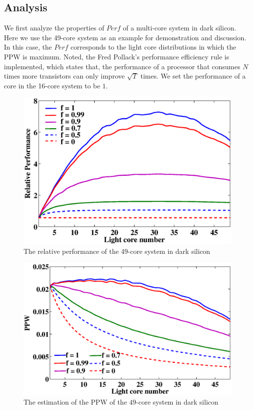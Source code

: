 \subsection{Analysis}
We first analyze the properties of $Perf$ of a multi-core system in dark silicon. Here we use the 49-core system as an example for demonstration and discussion. In this case, the $Perf$ corresponds to the light core distributions in which the PPW is maximum. Noted, the Fred Pollack's performance efficiency rule is implemented, which states that, the performance of a processor that consumes $N$ times more transistors can only improve $\sqrt{T}$ times. We set the performance of a core in the 16-core system to be $1$.

\begin{figure}
\centering
\includegraphics[width=1\linewidth]{fig/perf_boo_49.eps}
\caption{The relative performance of the 49-core system in dark silicon}
\end{figure}



\begin{figure}
\centering
\includegraphics[width=1\linewidth]{fig/ppw_boo_49.eps}
\caption{The estimation of the PPW of the $49$-core system in dark silicon}
\end{figure}

